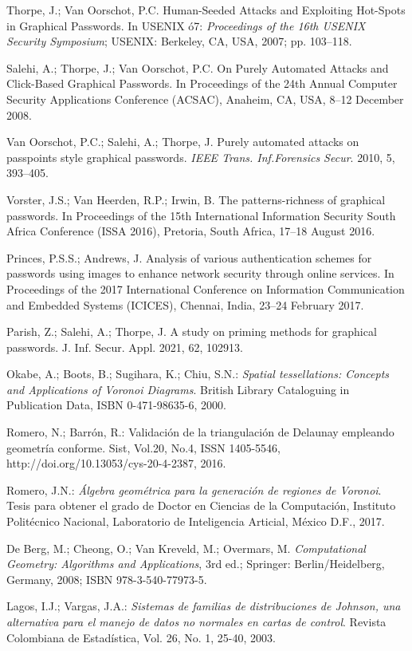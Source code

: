 \documentclass[12pt]{report}
\begin{document}
\begin{thebibliography}{9}
{		Thorpe, J.; Van Oorschot, P.C. Human-Seeded Attacks and Exploiting Hot-Spots in Graphical Passwords. In USENIX ó7: \textit{Proceedings of the 16th USENIX Security Symposium}; USENIX: Berkeley, CA, USA, 2007; pp. 103–118.
		
		Salehi, A.; Thorpe, J.; Van Oorschot, P.C. On Purely Automated Attacks and Click-Based Graphical Passwords. In Proceedings of the 24th Annual Computer Security Applications Conference (ACSAC), Anaheim, CA, USA, 8–12 December 2008.
		
		Van Oorschot, P.C.; Salehi, A.; Thorpe, J. Purely automated attacks on passpoints style graphical passwords.\textit{ IEEE Trans. Inf.Forensics Secur}. 2010, 5, 393–405.
		
		Vorster, J.S.; Van Heerden, R.P.; Irwin, B. The patterns-richness of graphical passwords. In Proceedings of the 15th International Information Security South Africa Conference (ISSA 2016), Pretoria, South Africa, 17–18 August 2016.
		
		Princes, P.S.S.; Andrews, J. Analysis of various authentication schemes for passwords using images to enhance network security through online services. In Proceedings of the 2017 International Conference on Information Communication and Embedded Systems (ICICES), Chennai, India, 23–24 February 2017.
		
		Parish, Z.; Salehi, A.; Thorpe, J. A study on priming methods for graphical passwords. J. Inf. Secur. Appl. 2021, 62, 102913.
		
		Okabe, A.; Boots, B.; Sugihara, K.; Chiu, S.N.: \textit{Spatial tessellations: Concepts and Applications of Voronoi Diagrams}. British Library Cataloguing in Publication Data, ISBN 0-471-98635-6, 2000.
		
		Romero, N.; Barrón, R.: Validación de la triangulación de Delaunay empleando geometría conforme. Sist, Vol.20, No.4, ISSN 1405-5546, http://doi.org/10.13053/cys-20-4-2387, 2016.
		
		Romero, J.N.:  \textit{Álgebra geométrica para la generación de regiones de Voronoi}. Tesis para obtener el grado de Doctor en Ciencias de la Computación, Instituto Politécnico Nacional, Laboratorio de Inteligencia Articial, México D.F., 2017.
		
		De Berg, M.; Cheong, O.; Van Kreveld, M.; Overmars, M. \textit{Computational Geometry: Algorithms and Applications}, 3rd ed.; Springer: Berlin/Heidelberg, Germany, 2008; ISBN 978-3-540-77973-5.
		
		Lagos, I.J.; Vargas, J.A.:\textit{ Sistemas de familias de distribuciones de Johnson, una alternativa para el manejo de datos no normales en cartas de control}. Revista Colombiana de  Estadística, Vol. 26, No. 1,
		25-40, 2003.
	
}
\end{thebibliography}
\end{document}
